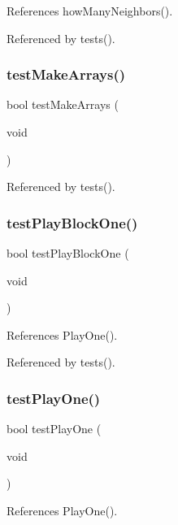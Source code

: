 References how\+Many\+Neighbors().



Referenced by tests().

\mbox{\label{tests_8h_af6e338851f3ccb4714e1bfb06ec4b428}} 
\subsubsection{test\+Make\+Arrays()}
{\footnotesize\ttfamily bool test\+Make\+Arrays (\begin{DoxyParamCaption}\item[{void}]{ }\end{DoxyParamCaption})}



Referenced by tests().

\mbox{\label{tests_8h_a4db05b9d62de31287c08dabadb3dacde}} 
\subsubsection{test\+Play\+Block\+One()}
{\footnotesize\ttfamily bool test\+Play\+Block\+One (\begin{DoxyParamCaption}\item[{void}]{ }\end{DoxyParamCaption})}



References Play\+One().



Referenced by tests().

\mbox{\label{tests_8h_aa4c8095a20d90a18d843ab63ecd02d00}} 
\subsubsection{test\+Play\+One()}
{\footnotesize\ttfamily bool test\+Play\+One (\begin{DoxyParamCaption}\item[{void}]{ }\end{DoxyParamCaption})}



References Play\+One().



